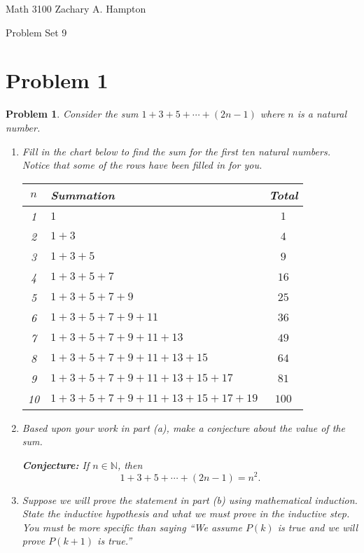 \documentclass[12pt]{article}
\newtheorem{problem}{Problem}
\theoremstyle{definition}
\begin{document}
Math 3100 \hfill Zachary A. Hampton

Problem Set 9 \hfill 
{}

\bigskip

\section*{Problem 1}

\begin{problem}
Consider the sum \(1 + 3 + 5 + \cdots + (2n - 1)\) where \(n\) is a natural number.

\begin{enumerate}[label=(\alph*)]
    \item Fill in the chart below to find the sum for the first ten natural numbers. Notice that some of the rows have been filled in for you.
    
    \begin{center}
    \begin{tabular}{|c|l|c|}
    \hline
    \(n\) & Summation & Total \\
    \hline
    1 & \(1\) & \(1\) \\
    2 & \(1 + 3\) & \(4\) \\
    3 & \(1 + 3 + 5\) & \(9\) \\
    4 & \(1 + 3 + 5 + 7\) & \(16\) \\
    5 & \(1 + 3 + 5 + 7 + 9\) & \(25\) \\
    6 & \(1 + 3 + 5 + 7 + 9 + 11\) & \(36\) \\
    7 & \(1 + 3 + 5 + 7 + 9 + 11 + 13\) & \(49\) \\
    8 & \(1 + 3 + 5 + 7 + 9 + 11 + 13 + 15\) & \(64\) \\
    9 & \(1 + 3 + 5 + 7 + 9 + 11 + 13 + 15 + 17\) & \(81\) \\
    10 & \(1 + 3 + 5 + 7 + 9 + 11 + 13 + 15 + 17 + 19\) & \(100\) \\
    \hline
    \end{tabular}
    \end{center}
    
    \item Based upon your work in part (a), make a conjecture about the value of the sum.
    
    \textbf{Conjecture:} If \( n \in \mathbb{N} \), then
    \[
    1 + 3 + 5 + \cdots + (2n - 1) = n^2.
    \]
    
    \item Suppose we will prove the statement in part (b) using mathematical induction. State the inductive hypothesis and what we must prove in the inductive step. You must be more specific than saying “We assume \( P(k) \) is true and we will prove \( P(k + 1) \) is true.”
    

\end{enumerate}
\end{problem}
\end{document}
